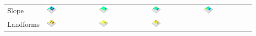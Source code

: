 \documentclass[prodmode,acmtochi]{acmsmall} %
\begin{document}
\begin{table}
{\begin{tabular}{m{} m{} m{} m{} m{}}
%
Slope &
\includegraphics[width=0.22\textwidth]{images/render_3d/slope_1.png} &
\includegraphics[width=0.22\textwidth]{images/render_3d/mean_slope_1.png} &
\includegraphics[width=0.22\textwidth]{images/render_3d/mean_slope_2.png} &
\includegraphics[width=0.22\textwidth]{images/render_3d/mean_slope_3.png}\\
%
Landforms &
\includegraphics[width=0.22\textwidth]{images/render_3d/forms_1.png} &
\includegraphics[width=0.22\textwidth]{images/render_3d/mean_forms_1.png} &
\includegraphics[width=0.22\textwidth]{images/render_3d/mean_forms_2.png} &

\end{tabular}}
\end{table}
\end{document}
